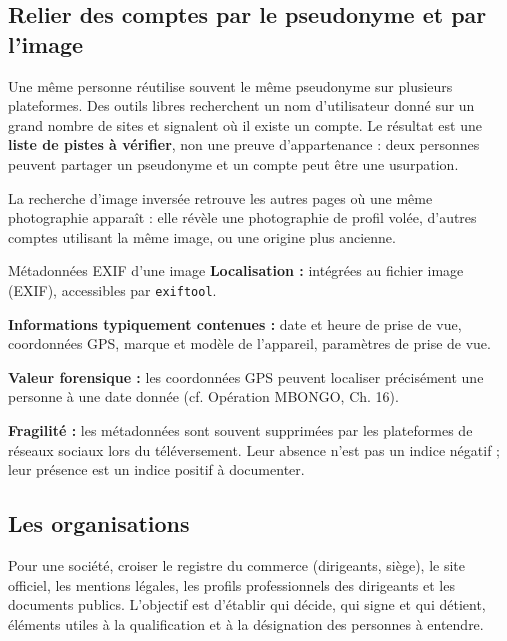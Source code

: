 \subsection{Relier des comptes par le pseudonyme et par l'image}

Une même personne réutilise souvent le même pseudonyme sur plusieurs plateformes. Des outils libres recherchent un nom d'utilisateur donné sur un grand nombre de sites et signalent où il existe un compte. Le résultat est une \textbf{liste de pistes à vérifier}, non une preuve d'appartenance : deux personnes peuvent partager un pseudonyme et un compte peut être une usurpation.

La recherche d'image inversée retrouve les autres pages où une même photographie apparaît : elle révèle une photographie de profil volée, d'autres comptes utilisant la même image, ou une origine plus ancienne.

\begin{boxartefact}{Métadonnées EXIF d'une image}
\textbf{Localisation :} intégrées au fichier image (EXIF), accessibles par \texttt{exiftool}.

\textbf{Informations typiquement contenues :} date et heure de prise de vue, coordonnées GPS, marque et modèle de l'appareil, paramètres de prise de vue.

\textbf{Valeur forensique :} les coordonnées GPS peuvent localiser précisément une personne à une date donnée (cf. Opération MBONGO, Ch. 16).

\textbf{Fragilité :} les métadonnées sont souvent supprimées par les plateformes de réseaux sociaux lors du téléversement. Leur absence n'est pas un indice négatif ; leur présence est un indice positif à documenter.
\end{boxartefact}

\subsection{Les organisations}

Pour une société, croiser le registre du commerce (dirigeants, siège), le site officiel, les mentions légales, les profils professionnels des dirigeants et les documents publics. L'objectif est d'établir qui décide, qui signe et qui détient, éléments utiles à la qualification et à la désignation des personnes à entendre.

